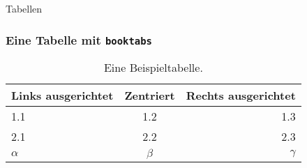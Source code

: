\begin{frame}{Tabellen}
    \frametitle{Eine Tabelle mit \texttt{booktabs}}
    
    \begin{table}
        \centering
        \begin{tabular}{lcr}
            \toprule
            Links ausgerichtet & Zentriert & Rechts ausgerichtet \\
            \midrule
            1.1 & 1.2 & 1.3 \\
            2.1 & 2.2 & 2.3 \\
            $\alpha$ & $\beta$ & $\gamma$ \\
            \bottomrule
        \end{tabular}
        \caption{Eine Beispieltabelle.}
    \end{table}
\end{frame}

